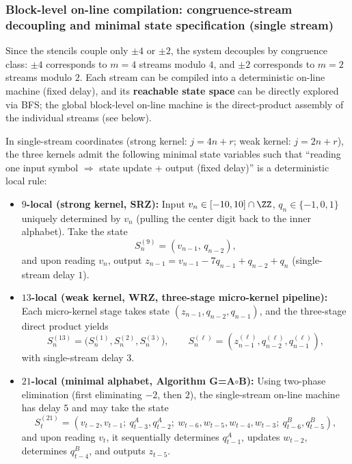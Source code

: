 \subsubsection{Block-level on-line compilation: congruence-stream decoupling and minimal state specification (single stream)}
Since the stencils couple only $\pm 4$ or $\pm 2$, the system decouples by congruence class: $\pm 4$ corresponds to $m=4$ streams modulo $4$, and $\pm 2$ corresponds to $m=2$ streams modulo $2$. Each stream can be compiled into a deterministic on-line machine (fixed delay), and its \textbf{reachable state space} can be directly explored via BFS; the global block-level on-line machine is the direct-product assembly of the individual streams (see below).

\begin{proposition}\label{prop:min-state-spec-flow}
In single-stream coordinates (strong kernel: $j=4n+r$; weak kernel: $j=2n+r$), the three kernels admit the following minimal state variables such that ``reading one input symbol $\Rightarrow$ state update + output (fixed delay)'' is a deterministic local rule:
\begin{itemize}
  \item \textbf{$9$-local (strong kernel, SRZ):} Input $v_n\in[-10,10]\cap\ZZ$, $q_n\in\{-1,0,1\}$ uniquely determined by $v_n$ (pulling the center digit back to the inner alphabet). Take the state
  \[
  S^{(9)}_n=(v_{n-1},\,q_{n-2}),
  \]
  and upon reading $v_n$, output $z_{n-1}=v_{n-1}-7q_{n-1}+q_{n-2}+q_n$ (single-stream delay $1$).
  \item \textbf{$13$-local (weak kernel, WRZ, three-stage micro-kernel pipeline):} Each micro-kernel stage takes state
  \(
  (z_{n-1},q_{n-2},q_{n-1})
  \), and the three-stage direct product yields
  \[
  S^{(13)}_n=\bigl(S^{(1)}_n,S^{(2)}_n,S^{(3)}_n\bigr),
  \qquad S^{(\ell)}_n=(z^{(\ell)}_{n-1},q^{(\ell)}_{n-2},q^{(\ell)}_{n-1}),
  \]
  with single-stream delay $3$.
  \item \textbf{$21$-local (minimal alphabet, Algorithm G=A$\circ$B):} Using two-phase elimination (first eliminating $-2$, then $2$), the single-stream on-line machine has delay $5$ and may take the state
  \[
  S^{(21)}_t=(v_{t-2},v_{t-1};\ q^A_{t-3},q^A_{t-2};\ w_{t-6},w_{t-5},w_{t-4},w_{t-3};\ q^B_{t-6},q^B_{t-5}),
  \]
  and upon reading $v_t$, it sequentially determines $q^A_{t-1}$, updates $w_{t-2}$, determines $q^B_{t-4}$, and outputs $z_{t-5}$.
\end{itemize}
\end{proposition}

